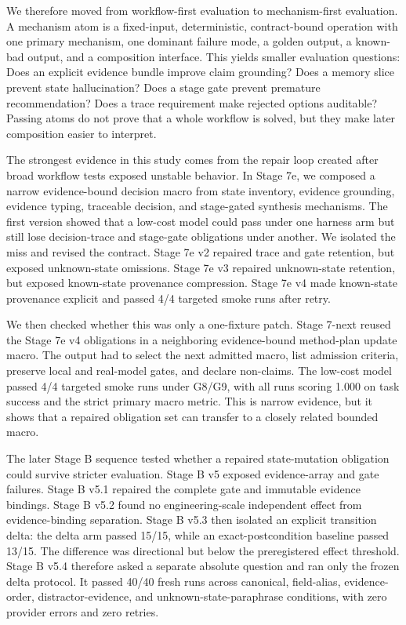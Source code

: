 \documentclass[11pt]{article}
\begin{document}
We therefore moved from workflow-first evaluation to mechanism-first evaluation. A mechanism atom is a fixed-input, deterministic, contract-bound operation with one primary mechanism, one dominant failure mode, a golden output, a known-bad output, and a composition interface. This yields smaller evaluation questions: Does an explicit evidence bundle improve claim grounding? Does a memory slice prevent state hallucination? Does a stage gate prevent premature recommendation? Does a trace requirement make rejected options auditable? Passing atoms do not prove that a whole workflow is solved, but they make later composition easier to interpret.

The strongest evidence in this study comes from the repair loop created after broad workflow tests exposed unstable behavior. In Stage 7e, we composed a narrow evidence-bound decision macro from state inventory, evidence grounding, evidence typing, traceable decision, and stage-gated synthesis mechanisms. The first version showed that a low-cost model could pass under one harness arm but still lose decision-trace and stage-gate obligations under another. We isolated the miss and revised the contract. Stage 7e v2 repaired trace and gate retention, but exposed unknown-state omissions. Stage 7e v3 repaired unknown-state retention, but exposed known-state provenance compression. Stage 7e v4 made known-state provenance explicit and passed 4/4 targeted smoke runs after retry.

We then checked whether this was only a one-fixture patch. Stage 7-next reused the Stage 7e v4 obligations in a neighboring evidence-bound method-plan update macro. The output had to select the next admitted macro, list admission criteria, preserve local and real-model gates, and declare non-claims. The low-cost model passed 4/4 targeted smoke runs under G8/G9, with all runs scoring 1.000 on task success and the strict primary macro metric. This is narrow evidence, but it shows that a repaired obligation set can transfer to a closely related bounded macro.

The later Stage B sequence tested whether a repaired state-mutation obligation could survive stricter evaluation. Stage B v5 exposed evidence-array and gate failures. Stage B v5.1 repaired the complete gate and immutable evidence bindings. Stage B v5.2 found no engineering-scale independent effect from evidence-binding separation. Stage B v5.3 then isolated an explicit transition delta: the delta arm passed 15/15, while an exact-postcondition baseline passed 13/15. The difference was directional but below the preregistered effect threshold. Stage B v5.4 therefore asked a separate absolute question and ran only the frozen delta protocol. It passed 40/40 fresh runs across canonical, field-alias, evidence-order, distractor-evidence, and unknown-state-paraphrase conditions, with zero provider errors and zero retries.
\end{document}

